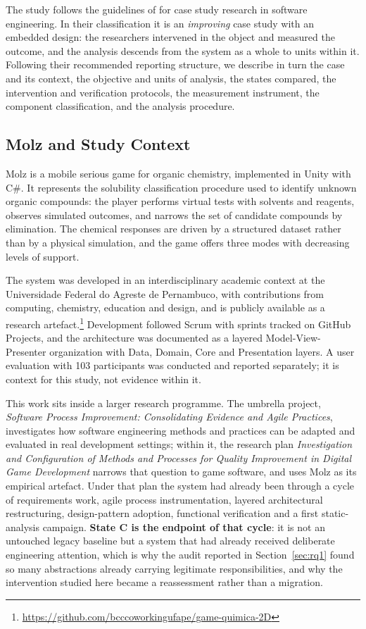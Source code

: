 \documentclass[pdflatex,sn-basic]{sn-jnl}
\begin{document}
The study follows the guidelines of \citet{runeson2009} for case study research in software engineering. In their classification it is an \emph{improving} case study with an embedded design: the researchers intervened in the object and measured the outcome, and the analysis descends from the system as a whole to units within it. Following their recommended reporting structure, we describe in turn the case and its context, the objective and units of analysis, the states compared, the intervention and verification protocols, the measurement instrument, the component classification, and the analysis procedure.

\subsection{Molz and Study Context}

Molz is a mobile serious game for organic chemistry, implemented in Unity with C\#. It represents the solubility classification procedure used to identify unknown organic compounds: the player performs virtual tests with solvents and reagents, observes simulated outcomes, and narrows the set of candidate compounds by elimination. The chemical responses are driven by a structured dataset rather than by a physical simulation, and the game offers three modes with decreasing levels of support.

The system was developed in an interdisciplinary academic context at the Universidade Federal do Agreste de Pernambuco, with contributions from computing, chemistry, education and design, and is publicly available as a research artefact.\footnote{\url{https://github.com/bcccoworkingufape/game-quimica-2D}} Development followed Scrum with sprints tracked on GitHub Projects, and the architecture was documented as a layered Model-View-Presenter organization with Data, Domain, Core and Presentation layers. A user evaluation with 103 participants was conducted and reported separately; it is context for this study, not evidence within it.

This work sits inside a larger research programme. The umbrella project, \emph{Software Process Improvement: Consolidating Evidence and Agile Practices}, investigates how software engineering methods and practices can be adapted and evaluated in real development settings; within it, the research plan \emph{Investigation and Configuration of Methods and Processes for Quality Improvement in Digital Game Development} narrows that question to game software, and uses Molz as its empirical artefact. Under that plan the system had already been through a cycle of requirements work, agile process instrumentation, layered architectural restructuring, design-pattern adoption, functional verification and a first static-analysis campaign. \textbf{State C is the endpoint of that cycle}: it is not an untouched legacy baseline but a system that had already received deliberate engineering attention, which is why the audit reported in Section~\ref{sec:rq1} found so many abstractions already carrying legitimate responsibilities, and why the intervention studied here became a reassessment rather than a migration.
\end{document}
